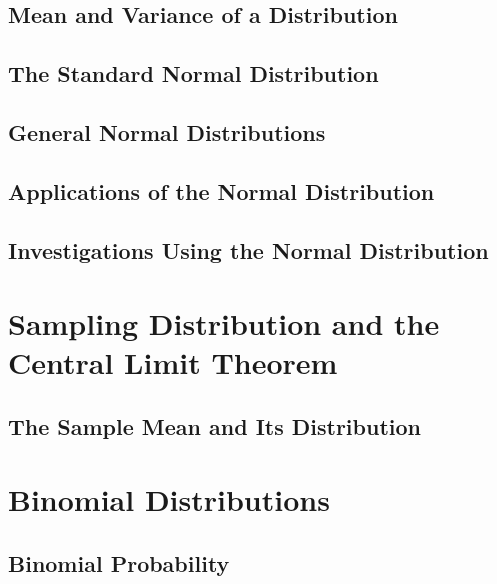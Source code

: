 \documentclass[12pt]{article}
\begin{document}
\subsection{Mean and Variance of a Distribution}


\subsection{The Standard Normal Distribution}


\subsection{General Normal Distributions}


\subsection{Applications of the Normal Distribution}


\subsection{Investigations Using the Normal Distribution}


\section{Sampling Distribution and the Central Limit Theorem}

\subsection{The Sample Mean and Its Distribution}


\section{Binomial Distributions}

\subsection{Binomial Probability}

\end{document}
